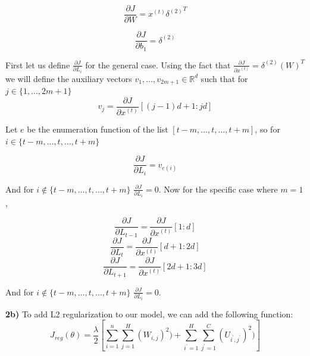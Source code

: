 \documentclass{article}
\begin{document}
\begin{equation}\label{eq:9}
\frac{\partial J}{\partial  W} = {x^{(t)} \delta^{(2)}}^{T}
\end{equation}

\begin{equation}\label{eq:10}
\frac{\partial J}{\partial  b_{1}} =  \delta^{(2)}
\end{equation}

First let us define $\frac{\partial J}{\partial  L_{i}}$ for the general case. Using the fact that $\frac{\partial J}{\partial  x^{(t)}}= \delta^{(2)} {(W)}^{T}$ we will define the auxiliary vectors  $v_{1}, \dots, v_{2m+1} \in \mathbb{R}^{d}$ such that for $j \in \{ 1, \dots, 2m+1\}$ 
\begin{equation}\label{eq:11}
v_{j} =  \frac{\partial J}{\partial  x^{(t)}}[(j-1)d +1: jd]
\end{equation}

Let $e$ be the enumeration function of the list $[t-m, \dots, t, \dots, t+m]$, so for $i \in \{ t-m, \dots, t, \dots, t+m \}$

\begin{equation}\label{eq:12}
\frac{\partial J}{\partial  L_{i}} =  v_{e(i)}
\end{equation}

And for $i \notin \{ t-m, \dots, t, \dots, t+m \}$ $\frac{\partial J}{\partial  L_{i}} =0$. Now for the specific case where $m=1$, 

\begin{equation}\label{eq:13}
\frac{\partial J}{\partial  L_{t-1}} =  \frac{\partial J}{\partial  x^{(t)}}[1: d]
\end{equation}
\begin{equation}\label{eq:14}
\frac{\partial J}{\partial  L_{t}} =  \frac{\partial J}{\partial  x^{(t)}}[d+1: 2d]
\end{equation}
\begin{equation}\label{eq:15}
\frac{\partial J}{\partial  L_{t+1}} =  \frac{\partial J}{\partial  x^{(t)}}[2d+1: 3d]
\end{equation}

And for $i \notin \{ t-m, \dots, t, \dots, t+m \}$ $\frac{\partial J}{\partial  L_{i}} =0$.

\textbf{2b)} To add L2 regularization to our model, we can add the following function:
\begin{equation}\label{eq:16}
J_{reg}(\theta) = \frac{\lambda}{2}[\sum_{i=1}^{n}\sum_{j=1}^{H}(W_{i,j})^{2}) + \sum_{i^{\prime}=1}^{H}\sum_{j^{\prime}=1}^{C}(U_{i^{\prime},j^{\prime}})^{2})]
\end{equation}
\end{document}
